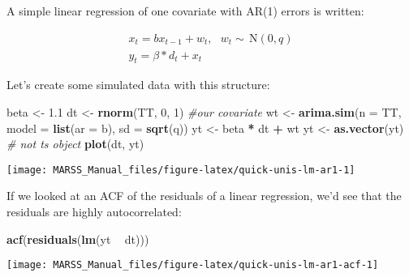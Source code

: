 \documentclass[12pt,]{book}
\newenvironment{Shaded}{\begin{snugshade}}{\end{snugshade}}
\newcommand{\CommentTok}[1]{\textcolor[rgb]{0.56,0.35,0.01}{\textit{#1}}}
\newcommand{\DataTypeTok}[1]{\textcolor[rgb]{0.13,0.29,0.53}{#1}}
\newcommand{\DecValTok}[1]{\textcolor[rgb]{0.00,0.00,0.81}{#1}}
\newcommand{\FloatTok}[1]{\textcolor[rgb]{0.00,0.00,0.81}{#1}}
\newcommand{\KeywordTok}[1]{\textcolor[rgb]{0.13,0.29,0.53}{\textbf{#1}}}
\newcommand{\NormalTok}[1]{#1}
\newcommand{\OperatorTok}[1]{\textcolor[rgb]{0.81,0.36,0.00}{\textbf{#1}}}
\newcommand{\StringTok}[1]{\textcolor[rgb]{0.31,0.60,0.02}{#1}}
\begin{document}
A simple linear regression of one covariate with AR(1) errors is written:

\begin{equation}
\begin{gathered}
x_{t} = bx_{t-1} + w_{t}, \text{ } w_t \sim \,\text{N}(0,q)  \\
y_{t} = \beta*d_t + x_{t}
\end{gathered}
\label{eq:short-lr-ar1}
\end{equation}

Let's create some simulated data with this structure:

\begin{Shaded}
\begin{Highlighting}[]
\NormalTok{beta <-}\StringTok{ }\FloatTok{1.1}
\NormalTok{dt <-}\StringTok{ }\KeywordTok{rnorm}\NormalTok{(TT, }\DecValTok{0}\NormalTok{, }\DecValTok{1}\NormalTok{)  }\CommentTok{#our covariate}
\NormalTok{wt <-}\StringTok{ }\KeywordTok{arima.sim}\NormalTok{(}\DataTypeTok{n =}\NormalTok{ TT, }\DataTypeTok{model =} \KeywordTok{list}\NormalTok{(}\DataTypeTok{ar =}\NormalTok{ b), }\DataTypeTok{sd =} \KeywordTok{sqrt}\NormalTok{(q))}
\NormalTok{yt <-}\StringTok{ }\NormalTok{beta }\OperatorTok{*}\StringTok{ }\NormalTok{dt }\OperatorTok{+}\StringTok{ }\NormalTok{wt}
\NormalTok{yt <-}\StringTok{ }\KeywordTok{as.vector}\NormalTok{(yt)  }\CommentTok{# not ts object}
\KeywordTok{plot}\NormalTok{(dt, yt)}
\end{Highlighting}
\end{Shaded}

\begin{center}\texttt{[image: MARSS\_Manual\_files/figure-latex/quick-unis-lm-ar1-1]} \end{center}

If we looked at an ACF of the residuals of a linear regression, we'd see that the residuals are highly autocorrelated:

\begin{Shaded}
\begin{Highlighting}[]
\KeywordTok{acf}\NormalTok{(}\KeywordTok{residuals}\NormalTok{(}\KeywordTok{lm}\NormalTok{(yt }\OperatorTok{~}\StringTok{ }\NormalTok{dt)))}
\end{Highlighting}
\end{Shaded}

\begin{center}\texttt{[image: MARSS\_Manual\_files/figure-latex/quick-unis-lm-ar1-acf-1]} \end{center}
\end{document}
